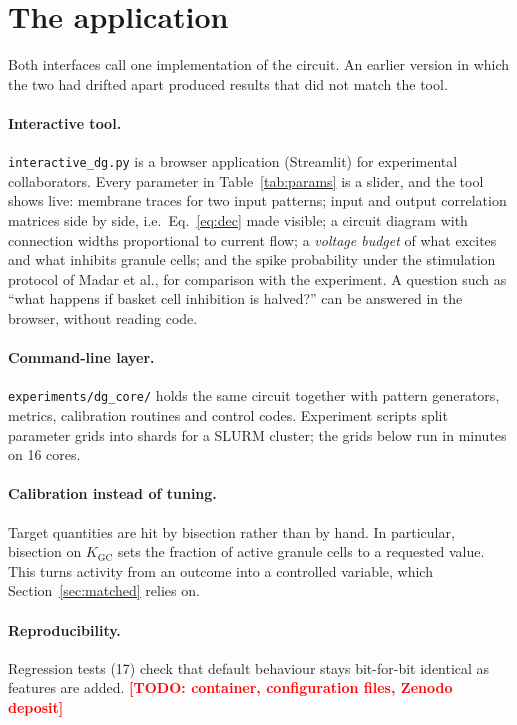 \documentclass[11pt,a4paper]{article}
\newcommand{\todo}[1]{\textcolor{red}{\textbf{[TODO: #1]}}}
\newcommand{\Kgc}{K_{\mathrm{GC}}}
\begin{document}
\section{The application}
\label{sec:app}

Both interfaces call one implementation of the circuit. An earlier version in
which the two had drifted apart produced results that did not match the tool.

\paragraph{Interactive tool.} \texttt{interactive\_dg.py} is a browser
application (Streamlit) for experimental collaborators. Every parameter in
Table~\ref{tab:params} is a slider, and the tool shows live: membrane traces for
two input patterns; input and output correlation matrices side by side, i.e.\
Eq.~\eqref{eq:dec} made visible; a circuit diagram with connection widths
proportional to current flow; a \emph{voltage budget} of what excites and what
inhibits granule cells; and the spike probability under the stimulation protocol
of Madar et al., for comparison with the experiment. A question such as ``what
happens if basket cell inhibition is halved?'' can be answered in the browser,
without reading code.

\paragraph{Command-line layer.} \texttt{experiments/dg\_core/} holds the same
circuit together with pattern generators, metrics, calibration routines and
control codes. Experiment scripts split parameter grids into shards for a SLURM
cluster; the grids below run in minutes on 16 cores.

\paragraph{Calibration instead of tuning.} Target quantities are hit by bisection
rather than by hand. In particular, bisection on $\Kgc$ sets the fraction of
active granule cells to a requested value. This turns activity from an outcome
into a controlled variable, which Section~\ref{sec:matched} relies on.

\paragraph{Reproducibility.} Regression tests (17) check that default behaviour
stays bit-for-bit identical as features are added.
\todo{container, configuration files, Zenodo deposit}
\end{document}
